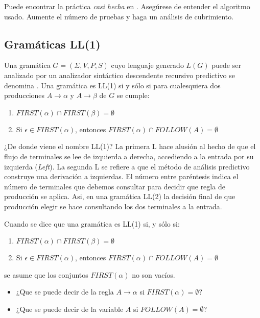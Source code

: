 Puede encontrar la práctica \emph{casi hecha} en
.
Asegúrese de entender el algoritmo usado.
Aumente el número de pruebas y haga un análisis de cubrimiento.

\subsection{Gramáticas LL(1)}
Una gramática $G = (\Sigma, V, P, S)$ cuyo lenguaje generado 
$L(G)$ puede ser analizado por un 
analizador sintáctico descendente recursivo predictivo
se denomina . Una gramática es LL(1) si y sólo si 
para cualesquiera dos
producciones $A \rightarrow \alpha$ y $A \rightarrow \beta$ de
$G$ se cumple:
\begin{enumerate}
\item
$FIRST(\alpha) \cap FIRST(\beta) = \emptyset$
\item
Si $\epsilon \in FIRST(\alpha)$, entonces $FIRST(\alpha) \cap FOLLOW(A) = \emptyset$
\end{enumerate}

¿De donde viene el nombre LL(1)? La primera L hace alusión al hecho de que 
el flujo de terminales se lee de izquierda a derecha, accediendo a la entrada
por su izquierda (\emph{Left}). La segunda L se refiere a que el método
de análisis predictivo construye una derivación a izquierdas. El número
entre paréntesis indica el número de terminales que debemos consultar para
decidir que regla de producción se aplica. Asi, en una gramática LL(2) la decisión 
final de que producción elegir se hace consultando los dos terminales a la entrada.

Cuando se dice que una gramática es LL(1) si, y sólo si:
\begin{enumerate}
\item
$FIRST(\alpha) \cap FIRST(\beta) = \emptyset$
\item
Si $\epsilon \in FIRST(\alpha)$, entonces $FIRST(\alpha) \cap FOLLOW(A) = \emptyset$
\end{enumerate}
se asume que los conjuntos $FIRST(\alpha)$ no son vacíos.
\begin{itemize}
\item
¿Que se puede decir de la regla  $A \rightarrow \alpha$ si
$FIRST(\alpha) = \emptyset$?
\item
¿Que se puede decir de la variable $A$ si $FOLLOW(A) = \emptyset$?
\end{itemize}


